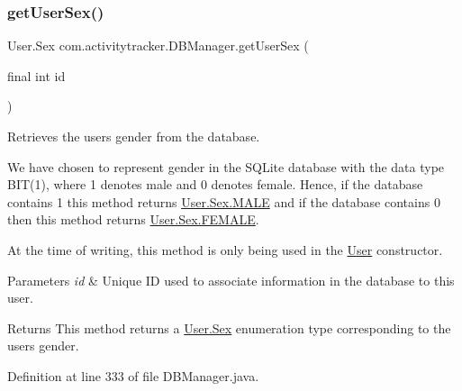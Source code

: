 \mbox{\label{classcom_1_1activitytracker_1_1_d_b_manager_a4e695c111b877cfd1d918602551f65a1}} 
\subsubsection{\texorpdfstring{get\+User\+Sex()}{getUserSex()}}
{\footnotesize\ttfamily User.\+Sex com.\+activitytracker.\+D\+B\+Manager.\+get\+User\+Sex (\begin{DoxyParamCaption}\item[{final int}]{id }\end{DoxyParamCaption})}

Retrieves the user\textquotesingle{}s gender from the database.

We have chosen to represent gender in the S\+Q\+Lite database with the data type B\+IT(1), where 1 denotes male and 0 denotes female. Hence, if the database contains 1 this method returns \mbox{\hyperlink{enumcom_1_1activitytracker_1_1_user_1_1_sex_ad3b626a38bd4615eb621d75b939f412d}{User.\+Sex.\+M\+A\+LE}} and if the database contains 0 then this method returns \mbox{\hyperlink{enumcom_1_1activitytracker_1_1_user_1_1_sex_a5c22ece8a4df71ed5202cd492990a752}{User.\+Sex.\+F\+E\+M\+A\+LE}}.

At the time of writing, this method is only being used in the \mbox{\hyperlink{classcom_1_1activitytracker_1_1_user}{User}} constructor.


\begin{DoxyParams}{Parameters}
{\em id} & Unique ID used to associate information in the database to this user.\\
\hline
\end{DoxyParams}
\begin{DoxyReturn}{Returns}
This method returns a \mbox{\hyperlink{enumcom_1_1activitytracker_1_1_user_1_1_sex}{User.\+Sex}} enumeration type corresponding to the user\textquotesingle{}s gender. 
\end{DoxyReturn}


Definition at line 333 of file D\+B\+Manager.\+java.

\mbox{\label{classcom_1_1activitytracker_1_1_d_b_manager_a20f726c054d6c8a6fc3ce629d87f1114}} 
